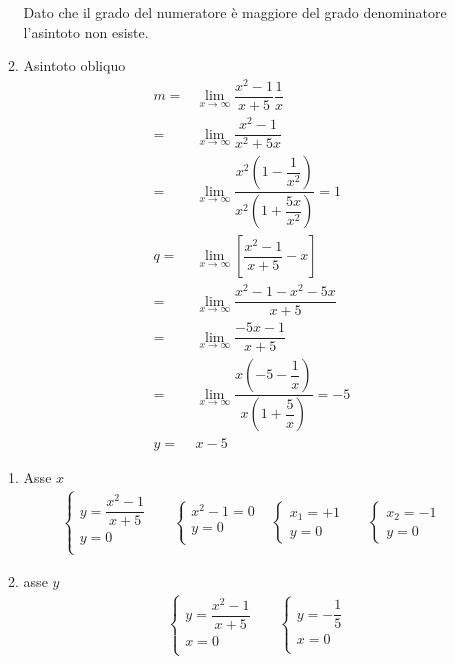 \begin{exercise}
\begin{itemize}
\begin{enumerate}
			Dato che il grado del  numeratore è maggiore del grado denominatore l'asintoto non esiste.
			\item Asintoto obliquo
			\begin{align*}
			m=&\lim_{x\to \infty}\dfrac{x^2-1}{x+5}\dfrac{1}{x}\\
			=&\lim_{x\to \infty}\dfrac{x^2-1}{x^2+5x}\\
			=&\lim_{x\to \infty}\dfrac{x^2\left(1-\dfrac{1}{x^2}\right)}{x^2\left(1+\dfrac{5x}{x^2}\right)}=1\\
			q=&\lim_{x\to \infty}[\dfrac{x^2-1}{x+5}-x]\\
			=&\lim_{x\to \infty}\dfrac{x^2-1-x^2-5x}{x+5}\\
			=&\lim_{x\to \infty}\dfrac{-5x-1}{x+5}\\
			=&\lim_{x\to \infty}\dfrac{x\left(-5-\dfrac{1}{x}\right)}{x\left(1+\dfrac{5}{x}\right)}=-5\\
			y=&x-5
			\end{align*}
		\end{enumerate}
	\begin{enumerate}
		\item Asse $x$
	\begin{align*}
		&\begin{cases}
	y=\dfrac{x^2-1}{x+5}\\
	y=0\\
	\end{cases}&
		&\begin{cases}
	x^2-1=0\\
	y=0\\
	\end{cases}
		&\begin{cases}
	x_1=+1\\
	y=0
	\end{cases}&
		&\begin{cases}
	x_2=-1\\
	y=0
	\end{cases}&
	\end{align*}
		\item asse $y$
			\begin{align*}
		&\begin{cases}
		y=\dfrac{x^2-1}{x+5}\\
		x=0\\
		\end{cases}&
		&\begin{cases}
		y=-\dfrac{1}{5}\\
		x=0\\
		\end{cases}

\end{align*}
\end{enumerate}
\end{itemize}
\end{exercise}
